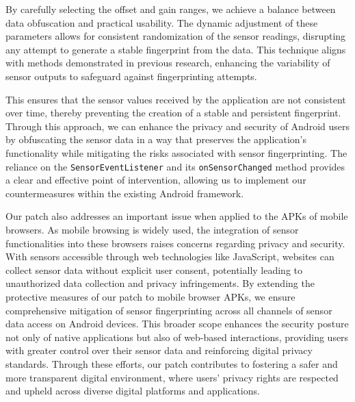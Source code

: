 \documentclass[11pt,
  oneside,openany,    %
]{scrreprt}
\begin{document}
By carefully selecting the offset and gain ranges, we achieve a balance between data obfuscation and practical usability.
The dynamic adjustment of these parameters allows for consistent randomization of the sensor readings, disrupting any attempt to generate a stable fingerprint from the data.
This technique aligns with methods demonstrated in previous research, enhancing the variability of sensor outputs to safeguard against fingerprinting attempts.

This ensures that the sensor values received by the application are not consistent over time, thereby preventing the creation of a stable and persistent fingerprint.
Through this approach, we can enhance the privacy and security of Android users by obfuscating the sensor data in a way that preserves the application's functionality while mitigating the risks associated with sensor fingerprinting.
The reliance on the \verb|SensorEventListener| and its \verb|onSensorChanged| method provides a clear and effective point of intervention, allowing us to implement our countermeasures within the existing Android framework.

Our patch also addresses an important issue when applied to the APKs of mobile browsers.
As mobile browsing is widely used, the integration of sensor functionalities into these browsers raises concerns regarding privacy and security.
With sensors accessible through web technologies like JavaScript, websites can collect sensor data without explicit user consent, potentially leading to unauthorized data collection and privacy infringements.
By extending the protective measures of our patch to mobile browser APKs, we ensure comprehensive mitigation of sensor fingerprinting across all channels of sensor data access on Android devices.
This broader scope enhances the security posture not only of native applications but also of web-based interactions, providing users with greater control over their sensor data and reinforcing digital privacy standards.
Through these efforts, our patch contributes to fostering a safer and more transparent digital environment, where users' privacy rights are respected and upheld across diverse digital platforms and applications.
\end{document}
